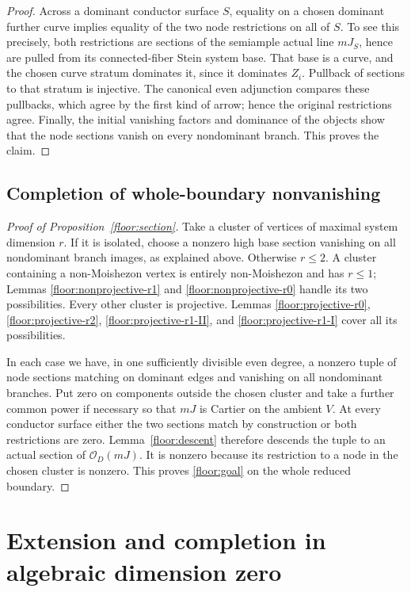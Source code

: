 \documentclass[11pt,letterpaper]{article}
\newcommand{\OO}{\mathcal{O}}
\theoremstyle{definition}
\theoremstyle{remark}
\begin{document}
\begin{proof}
Across a dominant conductor surface
$S$, equality on a chosen dominant
further curve implies equality of the
two node restrictions on all of $S$.
To see this precisely, both restrictions
are sections of the semiample actual
line $mJ_S$, hence are pulled from its
connected-fiber Stein system base.
That base is a curve, and the chosen
curve stratum dominates it, since it
dominates $Z_i$.  Pullback of sections
to that stratum is injective.  The
canonical even adjunction compares
these pullbacks, which agree by the
first kind of arrow; hence the original
restrictions agree.  Finally, the
initial vanishing factors and dominance
of the objects show that the node
sections vanish on every nondominant
branch.  This proves the claim.
\end{proof}

\subsection{Completion of whole-boundary nonvanishing}

\begin{proof}[Proof of Proposition~\ref{floor:section}]
Take a cluster of vertices of maximal system
dimension $r$.  If it is isolated, choose a
nonzero high base section vanishing on all
nondominant branch images, as explained
above.  Otherwise $r\le2$.  A cluster
containing a non-Moishezon vertex is entirely
non-Moishezon and has $r\le1$; Lemmas
\ref{floor:nonprojective-r1} and
\ref{floor:nonprojective-r0} handle its two
possibilities.  Every other cluster is
projective.  Lemmas
\ref{floor:projective-r0},
\ref{floor:projective-r2},
\ref{floor:projective-r1-II}, and
\ref{floor:projective-r1-I} cover all its
possibilities.

In each case we have, in one sufficiently
divisible even degree, a nonzero tuple of
node sections matching on dominant edges
and vanishing on all nondominant branches.
Put zero on components outside the chosen
cluster and take a further common power
if necessary so that $mJ$ is Cartier on
the ambient $V$.  At every conductor
surface either the two sections match
by construction or both restrictions
are zero.  Lemma~\ref{floor:descent}
therefore descends the tuple to an
actual section of $\OO_D(mJ)$.  It is
nonzero because its restriction to a
node in the chosen cluster is nonzero.
This proves \eqref{floor:goal} on the
whole reduced boundary.
\end{proof}

\section{Extension and completion in algebraic dimension zero}
\label{sec:completion}
\end{document}
